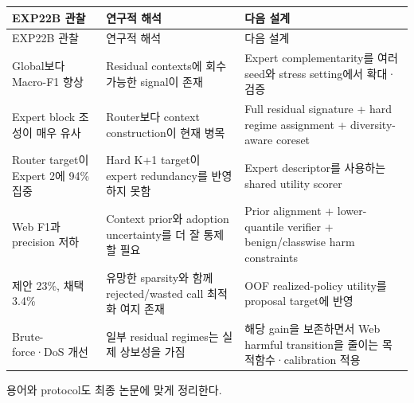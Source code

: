 \begingroup
\footnotesize
\begin{longtable}{>{\raggedright\arraybackslash}p{}>{\raggedright\arraybackslash}p{}>{\raggedright\arraybackslash}p{}}
\toprule
EXP22B 관찰 & 연구적 해석 & 다음 설계 \\ \midrule
\endfirsthead
EXP22B 관찰 & 연구적 해석 & 다음 설계 \\ \midrule
\endhead
{}Global보다 Macro-F1 향상 & Residual contexts에 회수 가능한 signal이 존재 & Expert complementarity를 여러 seed와 stress setting에서 확대·검증 \\
{}Expert block 조성이 매우 유사 & Router보다 context construction이 현재 병목 & Full residual signature +\allowbreak{} hard regime assignment +\allowbreak{} diversity-aware coreset \\
{}Router target이 Expert 2에 94\% 집중 & Hard K+\allowbreak{}1 target이 expert redundancy를 반영하지 못함 & Expert descriptor를 사용하는 shared utility scorer \\
{}Web F1과 precision 저하 & Context prior와 adoption uncertainty를 더 잘 통제할 필요 & Prior alignment +\allowbreak{} lower-quantile verifier +\allowbreak{} benign/\allowbreak{}classwise harm constraints \\
{}제안 23\%, 채택 3.4\% & 유망한 sparsity와 함께 rejected/\allowbreak{}wasted call 최적화 여지 존재 & OOF realized-policy utility를 proposal target에 반영 \\
{}Brute-force·DoS 개선 & 일부 residual regimes는 실제 상보성을 가짐 & 해당 gain을 보존하면서 Web harmful transition을 줄이는 목적함수·calibration 적용 \\
\bottomrule
\end{longtable}
\endgroup
용어와 protocol도 최종 논문에 맞게 정리한다.

